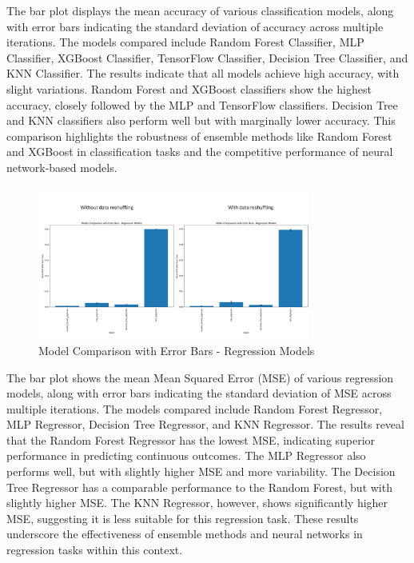 \documentclass{article}
\begin{document}
The bar plot displays the mean accuracy of various classification models, along with error bars indicating the standard deviation of accuracy across multiple iterations. The models compared include Random Forest Classifier, MLP Classifier, XGBoost Classifier, TensorFlow Classifier, Decision Tree Classifier, and KNN Classifier. The results indicate that all models achieve high accuracy, with slight variations. Random Forest and XGBoost classifiers show the highest accuracy, closely followed by the MLP and TensorFlow classifiers. Decision Tree and KNN classifiers also perform well but with marginally lower accuracy. This comparison highlights the robustness of ensemble methods like Random Forest and XGBoost in classification tasks and the competitive performance of neural network-based models.

\begin{figure}[H]
    \centering
    \includegraphics[width=0.8\textwidth]{images/regression_models2.png} %
    \caption{Model Comparison with Error Bars - Regression Models}
    \label{fig:regression_models}
\end{figure}

The bar plot shows the mean Mean Squared Error (MSE) of various regression models, along with error bars indicating the standard deviation of MSE across multiple iterations. The models compared include Random Forest Regressor, MLP Regressor, Decision Tree Regressor, and KNN Regressor. The results reveal that the Random Forest Regressor has the lowest MSE, indicating superior performance in predicting continuous outcomes. The MLP Regressor also performs well, but with slightly higher MSE and more variability. The Decision Tree Regressor has a comparable performance to the Random Forest, but with slightly higher MSE. The KNN Regressor, however, shows significantly higher MSE, suggesting it is less suitable for this regression task. These results underscore the effectiveness of ensemble methods and neural networks in regression tasks within this context.
\end{document}
